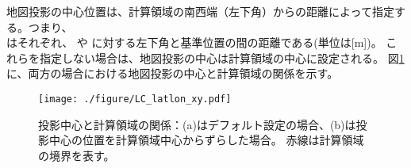 地図投影の中心位置は、計算領域の南西端（左下角）からの距離によって指定する。つまり、\\
はそれぞれ、
\XDIR や \YDIR に対する左下角と基準位置の間の距離である(単位は[m])。
これらを指定しない場合は、地図投影の中心は計算領域の中心に設定される。
図\ref{fig:map_lc}に、両方の場合における地図投影の中心と計算領域の関係を示す。


\begin{figure}[t]
\begin{center}
  \texttt{[image: ./figure/LC\_latlon\_xy.pdf]}\\
  \caption{投影中心と計算領域の関係：(a)はデフォルト設定の場合、(b)は投影中心の位置を計算領域中心からずらした場合。
  赤線は計算領域の境界を表す。}
  \label{fig:map_lc}
\end{center}
\end{figure}
